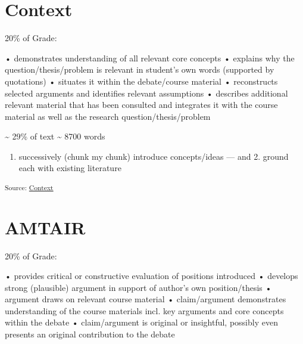 \documentclass[12pt,a4paper]{book}      %
\providecommand{\tightlist}{%
  \setlength{\itemsep}{0pt}\setlength{\parskip}{0pt}}
\begin{document}
\chapter{}\label{section-1}

\chapter{Context}\label{context}

20\% of Grade:

• demonstrates understanding of all relevant core concepts • explains
why the question/thesis/problem is relevant in student's own words
(supported by quotations) • situates it within the debate/course
material • reconstructs selected arguments and identifies relevant
assumptions • describes additional relevant material that has been
consulted and integrates it with the course material as well as the
research question/thesis/problem

\textasciitilde{} 29\% of text \textasciitilde{} 8700 words

\begin{enumerate}
\def\labelenumi{\arabic{enumi}.}
\tightlist
\item
  successively (chunk my chunk) introduce concepts/ideas --- and 2.
  ground each with existing literature
\end{enumerate}

\textsubscript{Source:
\href{https://VJMeyer.github.io/submission/chapters/Context.qmd.html\#41e533eb-06e4-4c34-b013-344a963258c1}{Context}}

\chapter{}\label{section-2}

\chapter{AMTAIR}\label{amtair}

20\% of Grade:

• provides critical or constructive evaluation of positions introduced •
develops strong (plausible) argument in support of author's own
position/thesis • argument draws on relevant course material •
claim/argument demonstrates understanding of the course materials incl.
key arguments and core concepts within the debate • claim/argument is
original or insightful, possibly even presents an original contribution
to the debate
\end{document}

